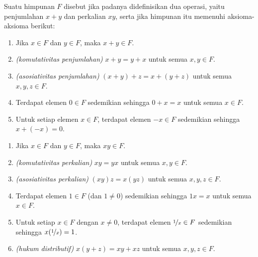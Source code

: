 \begin{defn}
Suatu himpunan $F$ disebut \emph{} jika padanya didefinisikan dua operasi,
yaitu penjumlahan $x+y$ dan perkalian $xy$, serta jika himpunan itu memenuhi
aksioma-aksioma berikut:
\begin{enumerate}[({A}1)]
\item
Jika $x \in F$ dan $y \in F$, maka $x+y \in F$.
\item
\emph{(komutativitas penjumlahan)}
$x+y = y+x$ untuk semua $x,y \in F$.
\item
\emph{(asosiativitas penjumlahan)}
$(x+y)+z = x+(y+z)$ untuk semua $x,y,z \in F$.
\item
Terdapat elemen $0 \in F$ sedemikian sehingga
$0+x = x$ untuk semua $x \in F$.
\item
Untuk setiap elemen $x\in F$, terdapat elemen $-x \in F$
sedemikian sehingga $x + (-x) = 0$.
\end{enumerate}
\begin{enumerate}[({M}1)]
\item
Jika $x \in F$ dan $y \in F$, maka $xy \in F$.
\item
\emph{(komutativitas perkalian)}
$xy = yx$ untuk semua $x,y \in F$.
\item
\emph{(asosiativitas perkalian)}
$(xy)z = x(yz)$ untuk semua $x,y,z \in F$.
\item
Terdapat elemen $1 \in F$ (dan $1 \neq 0$) sedemikian sehingga
$1x = x$ untuk semua $x \in F$.
\item
Untuk setiap $x\in F$ dengan $x \neq 0$, terdapat elemen
$\nicefrac{1}{x} \in F$
sedemikian sehingga $x(\nicefrac{1}{x}) = 1$.
\item[(D)]
\emph{(hukum distributif)} $x(y+z) = xy+xz$
untuk semua $x,y,z \in F$.
\end{enumerate}
\end{defn}

